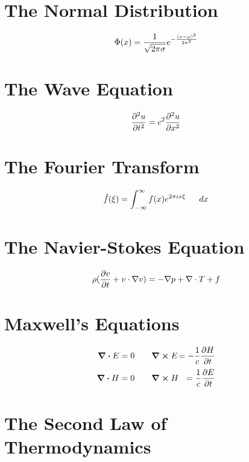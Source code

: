 \documentclass[]{article}
\begin{document}
{{{\section{The Normal Distribution}

{\fontsize{30pt}{36pt}\selectfont
\[
\LARGE{
	\Phi(x) =  \frac{1}{\sqrt{2 \pi \sigma}} e^{- \frac{(x - \mu)^2}{2 \sigma^2}}
}
\]
}

\section{The Wave Equation}

{\fontsize{30pt}{36pt}\selectfont
\[
\LARGE{
	\frac{\partial{{^2}u}}{{\partial{t}^2}} = c^2 \frac{\partial{{^2}u}}{{\partial{x}^2}}
}
\]
}

\section{The Fourier Transform}

{\fontsize{30pt}{36pt}\selectfont
\[
\LARGE{
	\hat{f}(\xi) = \int^{\infty}_{-\infty} f(x) e^{2\pi i x \xi} \quad dx
}
\]
}


\section{The Navier-Stokes Equation}

{\fontsize{30pt}{36pt}\selectfont
\[
\LARGE{
	\rho (\frac{\partial{v}}{\partial{t}} + v \cdot \nabla v ) = - \nabla p + \nabla \cdot T + f
}
\]
}

\section{Maxwell's Equations}

\begin{equation*}
	\begin{alignedat}{4}
\div E    & = 0   & \qquad  &  \curl E   & = - \frac{1}{c} \frac{\partial{H}}{{\partial{t}}}   \\[0.5ex]
\div H    & = 0   & \qquad  &  \curl H   & =   \frac{1}{c} \frac{\partial{E}}{{\partial{t}}}              
	\end{alignedat}
\end{equation*}

\section{The Second Law of Thermodynamics}

}}}
\end{document}
